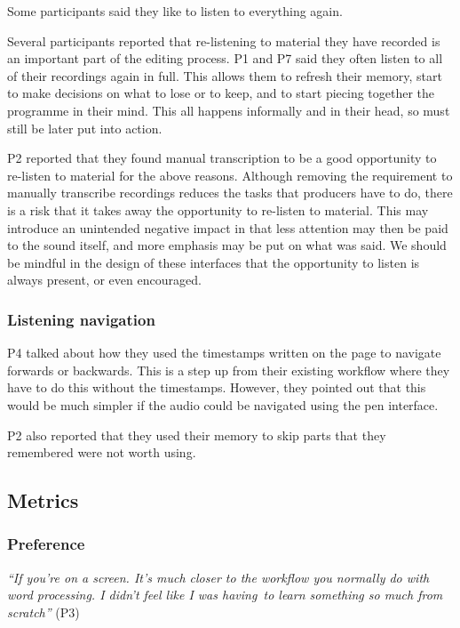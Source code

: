 
Some participants said they like to listen to everything again.

Several participants reported that re-listening to material they have recorded is an important part of the editing
process. P1 and P7 said they often listen to all of their recordings again in full. This allows them to refresh their
memory, start to make decisions on what to lose or to keep, and to start piecing together the programme in their mind.
This all happens informally and in their head, so must still be later put into action.

P2 reported that they found manual transcription to be a good opportunity to re-listen to material for the above
reasons. Although removing the requirement to manually transcribe recordings reduces the tasks that producers have to
do, there is a risk that it takes away the opportunity to re-listen to material. This may introduce an unintended
negative impact in that less attention may then be paid to the sound itself, and more emphasis may be put on what was
said. We should be mindful in the design of these interfaces that the opportunity to listen is always present, or even
encouraged.

\subsubsection{Listening navigation}

P4 talked about how they used the timestamps written on the page to navigate forwards or backwards. This is a step up
from their existing workflow where they have to do this without the timestamps. However, they pointed out that this
would be much simpler if the audio could be navigated using the pen interface.

P2 also reported that they used their memory to skip parts that they remembered were not worth using.

\subsection{Metrics}

\subsubsection{Preference}

\textit{``If you're on a screen. It's much closer to the workflow you normally do with word processing. I didn't feel
like I was having to learn something so much from scratch''} (P3)

